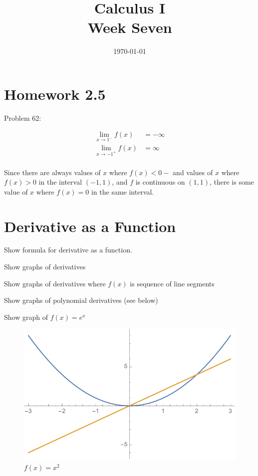\documentclass[letterpaper, landscape]{exam}
\author{}
\date{\today}
\title{Calculus I \\ Week Seven}
\begin{document}
  \maketitle
  \tableofcontents

  \section{Homework 2.5}

  Problem 62: 
  \begin{solution}
    \begin{align*}
      \lim_{x \to 1^-} f(x) &= - \infty \\ 
      \lim_{x \to -1^+} f(x) &= \infty \\ 
    \end{align*}

    Since there are always values of $x$ where $f(x) < 0-$ and values of
    $x$ where $f(x) > 0$ in the interval $(-1, 1)$, and $f$ is continuous on $(1, 1)$,
    there is some value of $x$ where $f(x) = 0$ in the same interval.

  \end{solution}

  \section{Derivative as a Function}

  \begin{itemize*}
    \item Show formula for derivative as a function.
    \item Show graphs of derivatives
    \item Show graphs of derivatives where $f(x)$ is sequence of line segments
    \item Show graphs of polynomial derivatives (see below)
    \item Show graph of $f(x) = e^x$
  \end{itemize*}

  \begin{figure}[H]
    \centering
    \includegraphics[scale = 0.5]{example06.pdf}
    \caption{$f(x) = x^2$}
    \label{fig:example06}
  \end{figure}
\end{document}
